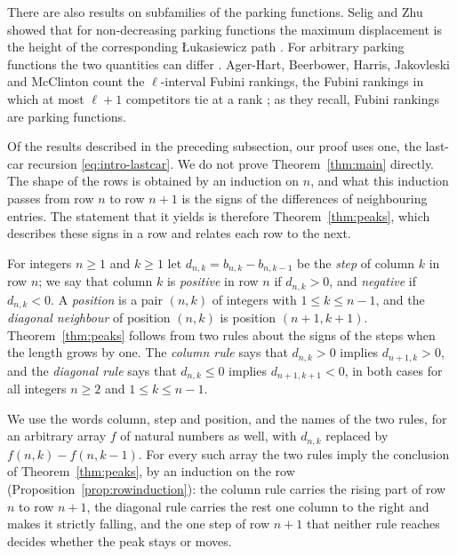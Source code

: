 \documentclass{amsart}
\makeatletter
\theoremstyle{definition}
\theoremstyle{remark}
\numberwithin{equation}{section}
\def\subsection{\@startsection{subsection}{2}\z@{.5\linespacing\@plus.7\linespacing}{-.5em}{\normalfont\bfseries\boldmath}}
\makeatother
\begin{document}
There are also results on subfamilies of the parking functions. Selig and Zhu showed that for
non-decreasing parking functions the maximum displacement is the height of
the corresponding {\L}ukasiewicz path \cite[Theorem~2.1]{seligzhu2024}. For
arbitrary parking functions the two quantities can differ
\cite[Remark~2.3]{seligzhu2024}.
Ager-Hart, Beerbower, Harris, Jakovleski and McClinton count the
$\ell$-interval Fubini rankings, the Fubini rankings in which at most
$\ell+1$ competitors tie at a rank \cite[Corollary~4.1]{agerhart2026}; as
they recall, Fubini rankings are parking functions.

\subsection{Outline of the proof}\label{subsec:intro-outline}

Of the results described in the preceding subsection, our proof uses one,
the last-car recursion \eqref{eq:intro-lastcar}. We do not prove
Theorem~\ref{thm:main} directly. The shape of the rows is obtained by an
induction on $n$, and what this induction passes from row $n$ to row $n+1$
is the signs of the differences of neighbouring entries. The statement that
it yields is therefore Theorem~\ref{thm:peaks}, which describes these signs
in a row and relates each row to the next.

For integers $n\ge1$ and $k\ge1$ let
$d_{n,k}=b_{n,k}-b_{n,k-1}$ be the \emph{step} of column $k$ in row $n$; we
say that column $k$ is \emph{positive} in row $n$ if $d_{n,k}>0$, and
\emph{negative} if $d_{n,k}<0$. A \emph{position} is a pair $(n,k)$ of
integers with $1\le k\le n-1$, and the \emph{diagonal neighbour} of position
$(n,k)$ is position $(n+1,k+1)$. Theorem~\ref{thm:peaks} follows from two
rules about the signs of the steps when the length grows by one. The
\emph{column rule} says that $d_{n,k}>0$ implies $d_{n+1,k}>0$, and the
\emph{diagonal rule} says that $d_{n,k}\le0$ implies $d_{n+1,k+1}<0$, in
both cases for all integers $n\ge2$ and $1\le k\le n-1$.

We use the words column, step and position, and the names of the two rules,
for an arbitrary array $f$ of natural numbers as well, with
$d_{n,k}$ replaced by $f(n,k)-f(n,k-1)$. For every such array the two
rules imply the conclusion of Theorem~\ref{thm:peaks}, by an induction on
the row (Proposition~\ref{prop:rowinduction}): the column rule carries the
rising part of row $n$ to row $n+1$, the diagonal rule carries the rest one
column to the right and makes it strictly falling, and the one step of row
$n+1$ that neither rule reaches decides whether the peak stays or moves.
\end{document}
